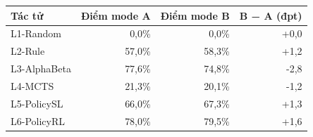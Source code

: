 \begin{center}\small
\begin{tabular}{@{}lrrr@{}}
\toprule
Tác tử & Điểm mode A & Điểm mode B & B − A (đpt) \\
\midrule
L1-Random & 0,0\% & 0,0\% & +0,0 \\
L2-Rule & 57,0\% & 58,3\% & +1,2 \\
L3-AlphaBeta & 77,6\% & 74,8\% & -2,8 \\
L4-MCTS & 21,3\% & 20,1\% & -1,2 \\
L5-PolicySL & 66,0\% & 67,3\% & +1,3 \\
L6-PolicyRL & 78,0\% & 79,5\% & +1,6 \\
\bottomrule
\end{tabular}
\end{center}